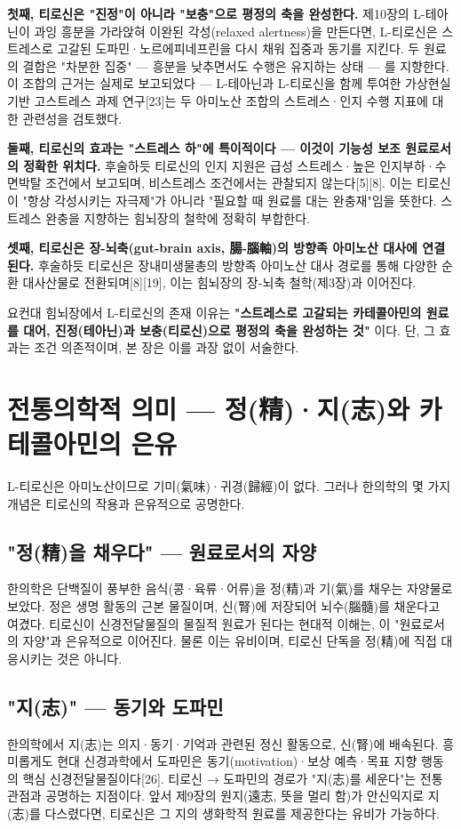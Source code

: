 \documentclass[11pt,oneside]{book}
\begin{document}
\textbf{첫째, 티로신은 "진정"이 아니라 "보충"으로 평정의 축을 완성한다.} 제10장의 L-테아닌이 과잉 흥분을 가라앉혀 이완된 각성(relaxed alertness)을 만든다면, L-티로신은 스트레스로 고갈된 도파민·노르에피네프린을 다시 채워 집중과 동기를 지킨다. 두 원료의 결합은 "차분한 집중" — 흥분을 낮추면서도 수행은 유지하는 상태 — 를 지향한다. 이 조합의 근거는 실제로 보고되었다 — L-테아닌과 L-티로신을 함께 투여한 가상현실 기반 고스트레스 과제 연구[23]는 두 아미노산 조합의 스트레스·인지 수행 지표에 대한 관련성을 검토했다.

\textbf{둘째, 티로신의 효과는 "스트레스 하"에 특이적이다 — 이것이 기능성 보조 원료로서의 정확한 위치다.} 후술하듯 티로신의 인지 지원은 급성 스트레스·높은 인지부하·수면박탈 조건에서 보고되며, 비스트레스 조건에서는 관찰되지 않는다[5][8]. 이는 티로신이 "항상 각성시키는 자극제"가 아니라 "필요할 때 원료를 대는 완충재"임을 뜻한다. 스트레스 완충을 지향하는 힘뇌장의 철학에 정확히 부합한다.

\textbf{셋째, 티로신은 장-뇌축(gut-brain axis, 腸-腦軸)의 방향족 아미노산 대사에 연결된다.} 후술하듯 티로신은 장내미생물총의 방향족 아미노산 대사 경로를 통해 다양한 순환 대사산물로 전환되며[8][19], 이는 힘뇌장의 장-뇌축 철학(제3장)과 이어진다.

요컨대 힘뇌장에서 L-티로신의 존재 이유는 \textbf{"스트레스로 고갈되는 카테콜아민의 원료를 대어, 진정(테아닌)과 보충(티로신)으로 평정의 축을 완성하는 것"} 이다. 단, 그 효과는 조건 의존적이며, 본 장은 이를 과장 없이 서술한다.

\section{전통의학적 의미 — 정(精)·지(志)와 카테콜아민의 은유}
L-티로신은 아미노산이므로 기미(氣味)·귀경(歸經)이 없다. 그러나 한의학의 몇 가지 개념은 티로신의 작용과 은유적으로 공명한다.

\subsection{"정(精)을 채우다" — 원료로서의 자양}
한의학은 단백질이 풍부한 음식(콩·육류·어류)을 정(精)과 기(氣)를 채우는 자양물로 보았다. 정은 생명 활동의 근본 물질이며, 신(腎)에 저장되어 뇌수(腦髓)를 채운다고 여겼다. 티로신이 신경전달물질의 물질적 원료가 된다는 현대적 이해는, 이 "원료로서의 자양"과 은유적으로 이어진다. 물론 이는 유비이며, 티로신 단독을 정(精)에 직접 대응시키는 것은 아니다.

\subsection{"지(志)" — 동기와 도파민}
한의학에서 지(志)는 의지·동기·기억과 관련된 정신 활동으로, 신(腎)에 배속된다. 흥미롭게도 현대 신경과학에서 도파민은 동기(motivation)·보상 예측·목표 지향 행동의 핵심 신경전달물질이다[26]. 티로신 → 도파민의 경로가 "지(志)를 세운다"는 전통 관점과 공명하는 지점이다. 앞서 제9장의 원지(遠志, 뜻을 멀리 함)가 안신익지로 지(志)를 다스렸다면, 티로신은 그 지의 생화학적 원료를 제공한다는 유비가 가능하다.
\end{document}

